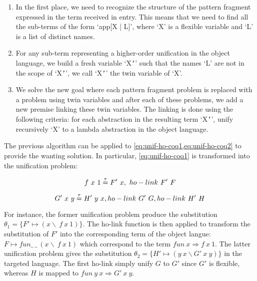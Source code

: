 \documentclass{rapport}
\begin{document}
\begin{enumerate}
  \item In the first place, we need to recognize the structure of the pattern
        fragment expressed in the term received in entry. This means that we
        need to find all the sub-terms of the form `app[X | L]', where `X' is
        a flexible variable and `L' is a list of distinct names.
  \item For any sub-term representing a higher-order unification in the object 
        language, we build a fresh variable `X\texttt{'}' such that the names 
        `L' are not in the scope of `X\texttt{'}', we call `X\texttt{'}' the 
        twin variable of `X'.
  \item We solve the new goal where each pattern fragment problem is replaced
        with a problem using twin variables and after each of these problems, we
        add a new premise linking these twin variables. The linking is done
        using the following criteria: for each abstraction in the resulting term
        `X\texttt{'}', unify recursively `X' to a lambda abstraction in the
        object language.
\end{enumerate}

The previous algorithm can be applied to \cref{eq:unif-ho-coq1,eq:unif-ho-coq2}
to provide the wanting solution. In particular, \cref{eq:unif-ho-coq1} is
transformed into the unification problem:

\begin{equation}
  f\ x\ 1 \mathrel{\overset{\mathrm{\tau}}{=}} F'\ x,\ ho-link\ F'\ F
  \label{eq:unif-ho-elpi1'}
\end{equation}

\begin{equation}
  G'\ x\ y \eqtau H'\ y\ x, ho-link\ G'\ G, ho-link\ H'\ H
  \label{eq:unif-ho-elpi2'}
\end{equation}

For instance, the former unification problem produce the substitution $\theta_1
= \{F' \mapsto (x\backslash\ f\ x\ 1)\}$. The ho-link function is then applied
to transform the substitution of $F'$ into the corresponding term of the object
langue: $F \mapsto fun \_\ \_\ (x\backslash\ f\ x\ 1)$ which correspond to the
term $fun\ x \Rightarrow f\ x\ 1$. The latter unification problem gives the
substitution $\theta_2 = \{H' \mapsto (y\ x \backslash G'\ x\ y)\}$ in the
targeted language. The first ho-link simply unify $G$ to $G'$ since $G'$ is
flexible, whereas $H$ is mapped to $fun\ y\ x \Rightarrow G'\ x\ y$.
\end{document}
